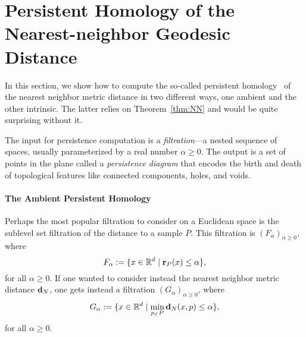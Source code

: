 \section{Persistent Homology of the Nearest-neighbor Geodesic Distance}
  \label{sec:persistence}

%
  In this section, we show how to compute the so-called persistent homology~\cite{edelsbrunner02topological} of the nearest neighbor metric distance in two different ways, one ambient and the other intrinsic.
  The latter relies on Theorem~\ref{thm:NN} and would be quite surprising without it.

  The input for persistence computation is a \emph{filtration}---a nested sequence of spaces, usually parameterized by a real number $\alpha\ge 0$.
  The output is a set of points in the plane called a \emph{persistence diagram} that encodes the birth and death of topological features like connected components, holes, and voids.

  \paragraph*{The Ambient Persistent Homology}

    Perhaps the most popular filtration to consider on a Euclidean space is the sublevel set filtration of the distance to a sample $P$.
    This filtration is $(F_\alpha)_{\alpha\ge 0}$, where
    \[
      F_\alpha := \{x\in \mathbb{R}^d \mid \mathbf{r}_P(x) \le \alpha\},
    \]
    for all $\alpha \ge 0$.
    If one wanted to consider instead the nearest neighbor metric distance $\mathbf{d}_N$, one gets instead a filtration $(G_\alpha)_{\alpha\ge 0}$, where
    \[
      G_\alpha := \{x\in \mathbb{R}^d \mid \min_{p_\in P} \mathbf{d}_N(x,p) \le \alpha\},
    \]
    for all $\alpha \ge 0$.

